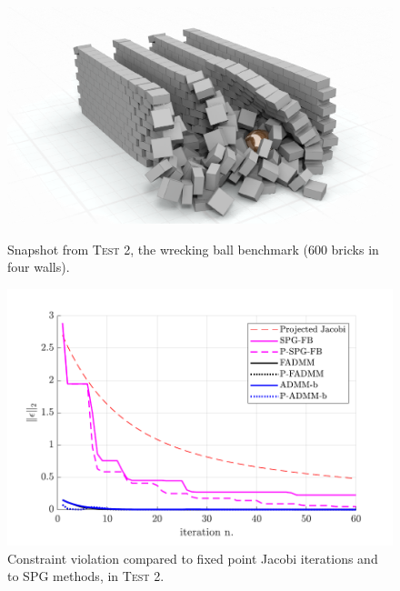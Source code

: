 \documentclass[AMA,STIX1COL]{WileyNJD-v2}
\begin{document}
\begin{figure}[!tbp]
  \centering
  \begin{minipage}[t]{0.48\textwidth}
    \includegraphics[width=\textwidth, trim=0cm -0cm 0cm 0cm]{pics/t8_snapshot.png}
    \caption{Snapshot from \textsc{Test 2}, the wrecking ball benchmark (600 bricks in four walls).}
		\label{fig:t6_primdual_a_ns}
  \end{minipage}
  \hfill
	\begin{minipage}[t]{0.48\textwidth}
    \includegraphics[width=\textwidth]{pics/t8_convergence.pdf}
    \caption{Constraint violation compared to fixed point Jacobi iterations and to SPG methods, in \textsc{Test 2}.}
		\label{fig:t8_convergence}
  \end{minipage}
\end{figure}
\end{document}
